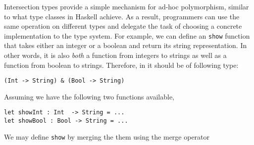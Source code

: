 Intersection types provide a simple mechanism for ad-hoc polymorphism, similar
to what type classes in Haskell achieve. As a result, programmers can use the
same operation on different types and delegate the task of choosing a concrete
implementation to the type system. For example, we can define an
\lstinline{show} function that takes either an integer or a boolean and return
its string representation. In other words, it is also \emph{both} a function
from integers to strings as well as a function from boolean to strings.
Therefore, in \name it should be of following type:
\begin{lstlisting}
(Int -> String) & (Bool -> String)
\end{lstlisting}
Assuming we have the following two functions available,
\begin{lstlisting}
let showInt : Int  -> String = ...
let showBool : Bool -> String = ...
\end{lstlisting}
We may define \lstinline{show} by merging the them using the merge operator

